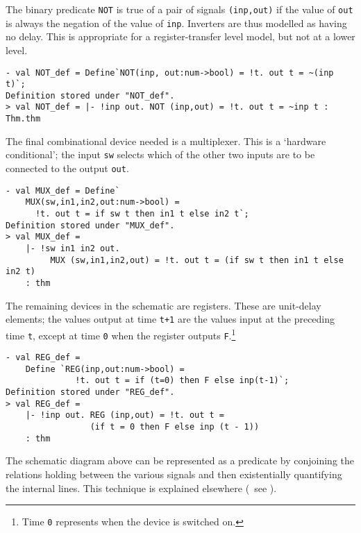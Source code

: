 The binary predicate {\small\verb|NOT|} is true of a pair of signals
{\small\verb|(inp,out)|} if the value of {\small\verb|out|} is always
the negation of the value of {\small\verb|inp|}. Inverters are thus
modelled as having no delay. This is appropriate for a
register-transfer level model, but not at a lower level.

\begin{session}
\begin{verbatim}
- val NOT_def = Define`NOT(inp, out:num->bool) = !t. out t = ~(inp t)`;
Definition stored under "NOT_def".
> val NOT_def = |- !inp out. NOT (inp,out) = !t. out t = ~inp t : Thm.thm
\end{verbatim}
\end{session}

\noindent The final combinational device needed is a multiplexer.
This is a `hardware conditional'; the input
{\small\verb|sw|} selects which of the other
two inputs are to be connected to the output {\small\verb|out|}.

\begin{session}
\begin{verbatim}
- val MUX_def = Define`
    MUX(sw,in1,in2,out:num->bool) =
      !t. out t = if sw t then in1 t else in2 t`;
Definition stored under "MUX_def".
> val MUX_def =
    |- !sw in1 in2 out.
         MUX (sw,in1,in2,out) = !t. out t = (if sw t then in1 t else in2 t)
    : thm
\end{verbatim}
\end{session}

The remaining devices in the schematic are registers.  These are
unit-delay elements; the values output at time {\small\verb|t+1|} are
the values input at the preceding time {\small\verb|t|}, except at
time {\small\verb|0|} when the register outputs
{\small\verb|F|}.\footnote{Time {\tt {\small 0}} represents when the
  device is switched on.}

\begin{session}
\begin{verbatim}
- val REG_def =
    Define `REG(inp,out:num->bool) =
              !t. out t = if (t=0) then F else inp(t-1)`;
Definition stored under "REG_def".
> val REG_def =
    |- !inp out. REG (inp,out) = !t. out t =
                 (if t = 0 then F else inp (t - 1))
    : thm
\end{verbatim}
\end{session}

The schematic diagram above can be represented as a predicate by
conjoining the relations holding between the various
signals and then existentially quantifying the internal lines.
This technique is explained elsewhere
(\eg\ see \cite{Camilleri-et-al,Why-HOL-paper}).

